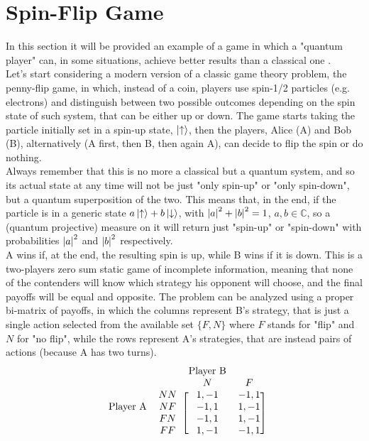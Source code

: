 \hfill

\section{Spin-Flip Game}
In this section it will be provided an example of a game in which a "quantum player" can, in some situations, achieve better results than a classical one \cite{invitation}.\\
Let's start considering a modern version of a classic game theory problem, the penny-flip game, in which, instead of a coin, players use spin-1/2 particles (e.g. electrons) and distinguish between two possible outcomes depending on the spin state of such system, that can be either up or down. The game starts taking the particle initially set in a spin-up state, $\ket{\uparrow}$, then the players, Alice (A) and Bob (B), alternatively (A first, then B, then again A), can decide to flip the spin or do nothing.\\
Always remember that this is no more a classical but a quantum system, and so its actual state at any time will not be just "only spin-up" or "only spin-down", but a quantum superposition of the two. This means that, in the end, if the particle is in a generic state $a\ket{\uparrow}+b\ket{\downarrow}$, with $\abs{a}^2 + \abs{b}^2 = 1$, $a,b\in\mathds{C}$, so a (quantum projective) measure on it will return just "spin-up" or "spin-down" with probabilities $\abs{a}^2$ and $\abs{b}^2$ respectively.\\
A wins if, at the end, the resulting spin is up, while B wins if it is down. This is a two-players zero sum static game of incomplete information, meaning that none of the contenders will know which strategy his opponent will choose, and the final payoffs will be equal and opposite. The problem can be analyzed using a proper bi-matrix of payoffs, in which the columns represent B's strategy, that is just a single action selected from the available set $\{F,N\}$ where $F$ stands for "flip" and $N$ for "no flip", while the rows represent A's strategies, that are instead pairs of actions (because A has two turns). 
\[ \begin{blockarray}{cccc}
& & \text{Player B}&\\
& & N & F\\
\begin{block}{cc[cc]}
& NN &1,-1 &  -1,1 \\
\text{Player A} & NF & -1,1 & 1,-1 \\
& FN & -1,1 & 1,-1 \\
& FF & 1,-1 &  -1,1 \\
\end{block}
\end{blockarray} \]
